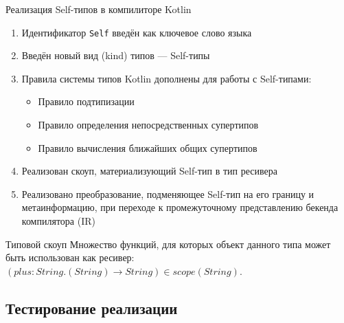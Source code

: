 \documentclass[aspectratio=169,usenames,dvipsnames]{beamer}
\begin{document}
    \begin{frame}{Реализация Self-типов в компилиторе Kotlin}

        \begin{enumerate}
            \item Идентификатор \texttt{Self} введён как ключевое слово языка
            \item Введён новый вид (kind) типов --- Self-типы
            \item Правила системы типов Kotlin дополнены для работы с Self-типами:
            \begin{itemize}
                \item Правило подтипизации
                \item Правило определения непосредственных супертипов
                \item Правило вычисления ближайших общих супертипов
            \end{itemize}
            \item Реализован скоуп, материализующий Self-тип в тип ресивера
            \item Реализовано преобразование, подменяющее Self-тип на его границу и метаинформацию, при переходе к промежуточному представлению бекенда компилятора (IR)
        \end{enumerate}

        \begin{block}{Типовой скоуп}
            Множество функций, для которых объект данного типа может быть использован как ресивер: $(plus : String.(String) \to String) \in scope(String)$.
        \end{block}
    \end{frame}


    \subsection{Тестирование реализации}
\end{document}
